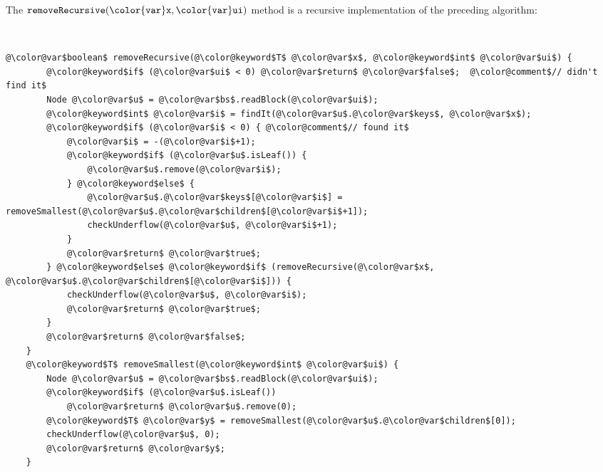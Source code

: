 \documentclass[10pt]{book}
\theoremstyle{plain}
\theoremstyle{definition}
\begin{document}
The \ensuremath{\mathtt{removeRecursive({\color{var}x},{\color{var}ui})}} method is a recursive implementation of the
preceding algorithm:


 \ \vspace{.5ex}\begin{Verbatim}[gobble=1,tabsize=2,frame=single,framerule=1.2pt,commandchars=\\@\$,label=\texttt{BTree},labelposition=topline]
	@\color@var$boolean$ removeRecursive(@\color@keyword$T$ @\color@var$x$, @\color@keyword$int$ @\color@var$ui$) {
		@\color@keyword$if$ (@\color@var$ui$ < 0) @\color@var$return$ @\color@var$false$;  @\color@comment$// didn't find it$
		Node @\color@var$u$ = @\color@var$bs$.readBlock(@\color@var$ui$);
		@\color@keyword$int$ @\color@var$i$ = findIt(@\color@var$u$.@\color@var$keys$, @\color@var$x$);
		@\color@keyword$if$ (@\color@var$i$ < 0) { @\color@comment$// found it$
			@\color@var$i$ = -(@\color@var$i$+1);
			@\color@keyword$if$ (@\color@var$u$.isLeaf()) {
				@\color@var$u$.remove(@\color@var$i$);
			} @\color@keyword$else$ {
				@\color@var$u$.@\color@var$keys$[@\color@var$i$] = removeSmallest(@\color@var$u$.@\color@var$children$[@\color@var$i$+1]);
				checkUnderflow(@\color@var$u$, @\color@var$i$+1);
			}
			@\color@var$return$ @\color@var$true$;  
		} @\color@keyword$else$ @\color@keyword$if$ (removeRecursive(@\color@var$x$, @\color@var$u$.@\color@var$children$[@\color@var$i$])) {
			checkUnderflow(@\color@var$u$, @\color@var$i$);
			@\color@var$return$ @\color@var$true$;
		}
		@\color@var$return$ @\color@var$false$;
	}
	@\color@keyword$T$ removeSmallest(@\color@keyword$int$ @\color@var$ui$) {
		Node @\color@var$u$ = @\color@var$bs$.readBlock(@\color@var$ui$);
		@\color@keyword$if$ (@\color@var$u$.isLeaf()) 
			@\color@var$return$ @\color@var$u$.remove(0);
		@\color@keyword$T$ @\color@var$y$ = removeSmallest(@\color@var$u$.@\color@var$children$[0]);  
		checkUnderflow(@\color@var$u$, 0);
		@\color@var$return$ @\color@var$y$;
	}
\end{Verbatim}
\end{document}
